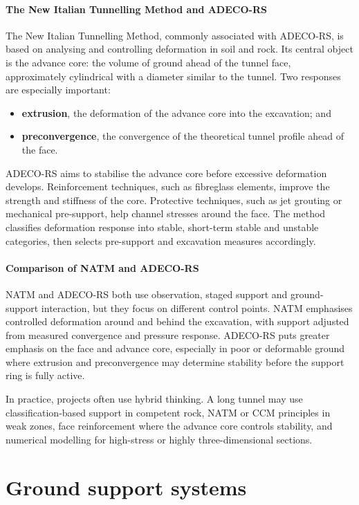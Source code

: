\paragraph{The New Italian Tunnelling Method and ADECO-RS}
\label{sec:adeco-rs}
The New Italian Tunnelling Method, commonly associated with ADECO-RS, is based on analysing and controlling deformation in soil and rock. Its central object is the advance core: the volume of ground ahead of the tunnel face, approximately cylindrical with a diameter similar to the tunnel. Two responses are especially important:
\begin{itemize}
 \item \textbf{extrusion}, the deformation of the advance core into the excavation; and
 \item \textbf{preconvergence}, the convergence of the theoretical tunnel profile ahead of the face.
\end{itemize}
ADECO-RS aims to stabilise the advance core before excessive deformation develops. Reinforcement techniques, such as fibreglass elements, improve the strength and stiffness of the core. Protective techniques, such as jet grouting or mechanical pre-support, help channel stresses around the face. The method classifies deformation response into stable, short-term stable and unstable categories, then selects pre-support and excavation measures accordingly.

\paragraph{Comparison of NATM and ADECO-RS}
\label{sec:natm-vs-adeco}
NATM and ADECO-RS both use observation, staged support and ground-support interaction, but they focus on different control points. NATM emphasises controlled deformation around and behind the excavation, with support adjusted from measured convergence and pressure response. ADECO-RS puts greater emphasis on the face and advance core, especially in poor or deformable ground where extrusion and preconvergence may determine stability before the support ring is fully active.

In practice, projects often use hybrid thinking. A long tunnel may use classification-based support in competent rock, NATM or CCM principles in weak zones, face reinforcement where the advance core controls stability, and numerical modelling for high-stress or highly three-dimensional sections.

\section{Ground support systems}
\label{sec:ground-support-systems}

